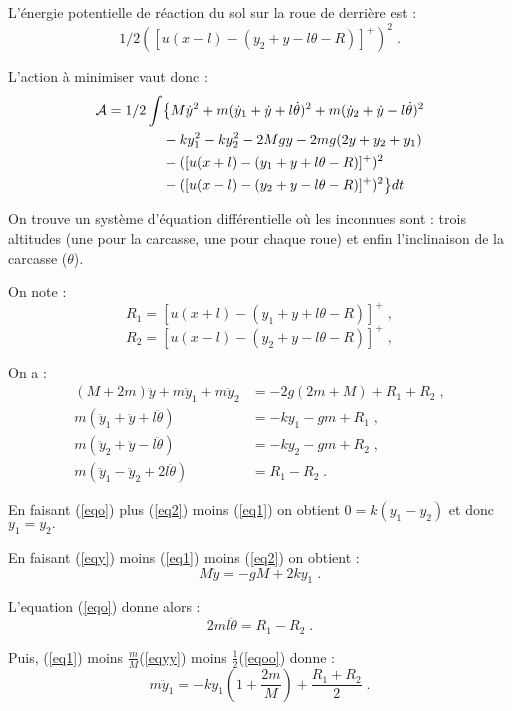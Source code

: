 \documentclass[a4paper,11pt]{amsart}
\begin{document}
L'\'energie potentielle de r\'eaction du sol sur la roue de derri\`ere est :
$$1/2([u(x-l)-(y_2+y-l\theta-R)]^+)^2\;.$$


L'action \`a minimiser vaut donc :
\begin{align*}
{\mathcal A}=1/2\int &\big\{ M\dot{y}^2+m(\dot{y}_1+\dot{y}+l\dot{\theta})^2+
m(\dot{y}_2+\dot{y}-l\dot{\theta})^2 \\
&-ky_1^2-ky_2^2-2Mgy-2mg(2y+y_2+y_1) \\
&-([u(x+l)-(y_1+y+l\theta-R)]^+)^2\\
&-([u(x-l)-(y_2+y-l\theta-R)]^+)^2 \big\} dt\;
\end{align*}

On trouve un syst\`eme
d'\'equation diff\'erentielle o\`u les inconnues sont : trois
altitudes (une pour la carcasse, une pour chaque roue)
et enfin l'inclinaison de la carcasse ($\theta$).

On note :
$$R_1 =[u(x+l)-(y_1+y+l\theta-R)]^+\;,$$
$$R_2 =[u(x-l)-(y_2+y-l\theta-R)]^+\;,$$

On a :
\begin{align}
(M+2m)\ddot{y}+m\ddot{y}_1+m\ddot{y}_2 & = -2g(2m+M)+R_1+R_2\label{eqy}\;,\\
m(\ddot{y}_1+\ddot{y}+l\ddot{\theta}) &  = -ky_1-gm+R_1\label{eq1}\;,\\
m(\ddot{y}_2+\ddot{y}-l\ddot{\theta}) & = -ky_2-gm+R_2\label{eq2}\;,\\
m(\ddot{y}_1-\ddot{y}_2+2l\ddot{\theta}) & = R_1-R_2\label{eqo}\;.
\end{align}

En faisant  (\ref{eqo}) plus (\ref{eq2}) moins (\ref{eq1}) on obtient
$0 =k(y_1-y_2)$
et donc $y_1=y_2.$

En faisant  (\ref{eqy}) moins (\ref{eq1}) moins (\ref{eq2}) on obtient :
\begin{equation}
M\ddot{y}=-gM+2ky_1\;.\label{eqyy}
\end{equation}

L'equation (\ref{eqo}) donne alors :
\begin{equation}
2ml\ddot{\theta}= R_1-R_2\;. \label{eqoo}
\end{equation}

Puis, (\ref{eq1}) moins $\frac{m}{M}$(\ref{eqyy}) moins $\frac{1}{2}$(\ref{eqoo})
donne :
\begin{equation}
m\ddot{y}_1 = -ky_1(1+\frac{2m}{M})+\frac{R_1+R_2}{2}\;.
\end{equation}

\end{document}
